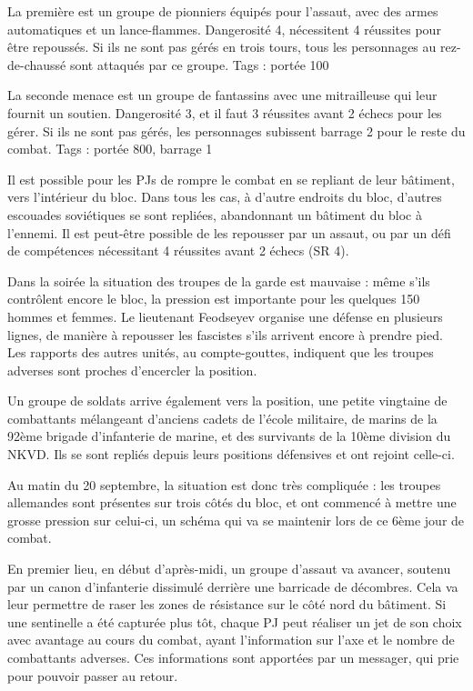 \documentclass{report}
\begin{document}
\begin{multicols}{2}
La première est un groupe de pionniers équipés pour l'assaut, avec des armes automatiques et un lance-flammes. Dangerosité 4, nécessitent 4 réussites pour être repoussés. Si ils ne sont pas gérés en trois tours, tous les personnages au rez-de-chaussé sont attaqués par ce groupe. Tags : portée 100

La seconde menace est un groupe de fantassins avec une mitrailleuse qui leur fournit un soutien. Dangerosité 3, et il faut 3 réussites avant 2 échecs pour les gérer. Si ils ne sont pas gérés, les personnages subissent barrage 2 pour le reste du combat. Tags : portée 800, barrage 1

Il est possible pour les PJs de rompre le combat en se repliant de leur bâtiment, vers l'intérieur du bloc. Dans tous les cas, à d'autre endroits du bloc, d'autres escouades soviétiques se sont repliées, abandonnant un bâtiment du bloc à l'ennemi. Il est peut-être possible de les repousser par un assaut, ou par un défi de compétences nécessitant 4 réussites avant 2 échecs (SR 4).

Dans la soirée la situation des troupes de la garde est mauvaise : même s'ils contrôlent encore le bloc, la pression est importante pour les quelques 150 hommes et femmes. Le lieutenant Feodseyev organise une défense en plusieurs lignes, de manière à repousser les fascistes s'ils arrivent encore à prendre pied. Les rapports des autres unités, au compte-gouttes, indiquent que les troupes adverses sont proches d'encercler la position.

Un groupe de soldats arrive également vers la position, une petite vingtaine de combattants mélangeant d'anciens cadets de l'école militaire, de marins de la 92ème brigade d'infanterie de marine, et des survivants de la 10ème division du NKVD. Ils se sont repliés depuis leurs positions défensives et ont rejoint celle-ci.

Au matin du 20 septembre, la situation est donc très compliquée : les troupes allemandes sont présentes sur trois côtés du bloc, et ont commencé à mettre une grosse pression sur celui-ci, un schéma qui va se maintenir lors de ce 6ème jour de combat. 

En premier lieu, en début d'après-midi, un groupe d'assaut va avancer, soutenu par un canon d'infanterie dissimulé derrière une barricade de décombres. Cela va leur permettre de raser les zones de résistance sur le côté nord du bâtiment. Si une sentinelle a été capturée plus tôt, chaque PJ peut réaliser un jet de son choix avec avantage au cours  du combat, ayant l'information sur l'axe et le nombre de combattants adverses. Ces informations sont apportées par un messager, qui prie pour pouvoir passer au retour.


\end{multicols}
\end{document}
